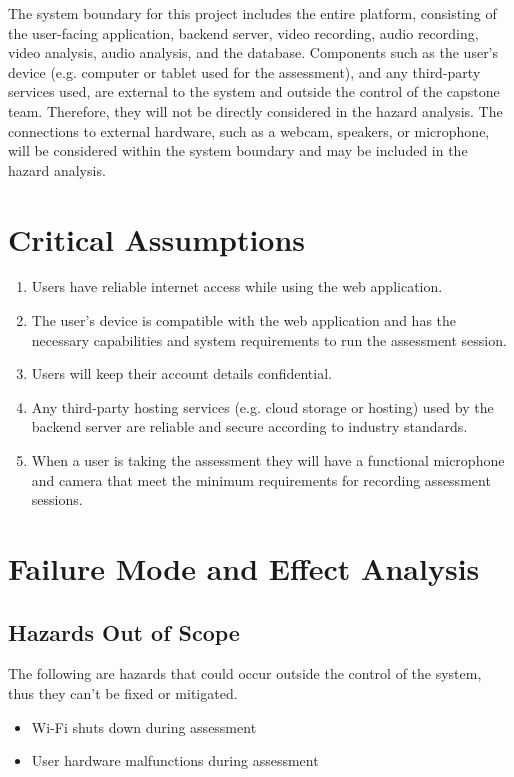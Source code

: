 \documentclass{article}
\begin{document}
The system boundary for this project includes the entire platform, consisting of the user-facing application, backend server, 
video recording, audio recording, video analysis, audio analysis, and the database. Components such as the user's device (e.g. computer or 
tablet used for the assessment), and any third-party services used, are external to the system and outside the control of 
the capstone team. Therefore, they will not be directly considered in the hazard analysis. The connections to external hardware, such as a webcam, speakers, or microphone,
will be considered within the system boundary and may be included in the hazard analysis.

\section{Critical Assumptions}
\begin{enumerate}
    \item Users have reliable internet access while using the web application.
    \item The user's device is compatible with the web application and has the necessary capabilities and system requirements to run the assessment session.
    \item Users will keep their account details confidential.
    \item Any third-party hosting services (e.g. cloud storage or hosting) used by the backend server are reliable and secure according to industry standards.
    \item When a user is taking the assessment they will have a functional microphone and camera that meet the minimum requirements for recording assessment sessions.
\end{enumerate}

\section{Failure Mode and Effect Analysis}
\subsection{Hazards Out of Scope}
The following are hazards that could occur outside the control of the system, thus they can't be fixed or mitigated.
\begin{itemize}
    \item Wi-Fi shuts down during assessment
    \item User hardware malfunctions during assessment
\end{itemize}
\end{document}
